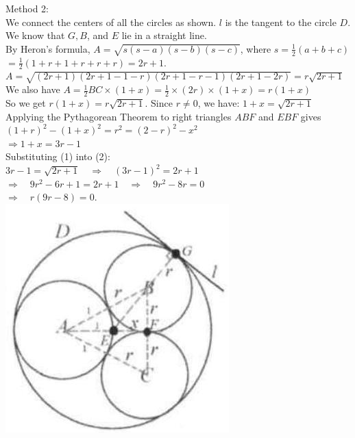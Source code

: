 \documentclass[10pt]{article}
\begin{document}
Method 2:\\
We connect the centers of all the circles as shown. \(l\) is the tangent to the circle \(D\). We know that \(G, B\), and \(E\) lie in a straight line.\\
By Heron's formula, \(A=\sqrt{s(s-a)(s-b)(s-c)}\), where \(s=\frac{1}{2}(a+b+c)\)\\
\(=\frac{1}{2}(1+r+1+r+r+r)=2 r+1\).\\
\(A=\sqrt{(2 r+1)(2 r+1-1-r)(2 r+1-r-1)(2 r+1-2 r)}=r \sqrt{2 r+1}\)\\
We also have \(A=\frac{1}{2} B C \times(1+x)=\frac{1}{2} \times(2 r) \times(1+x)=r(1+x)\)\\
So we get \(r(1+x)=r \sqrt{2 r+1}\). Since \(r \neq 0\), we have: \(1+x=\sqrt{2 r+1}\)\\
Applying the Pythagorean Theorem to right triangles \(A B F\) and \(E B F\) gives\\
\((1+r)^{2}-(1+x)^{2}=r^{2}=(2-r)^{2}-x^{2}\)\\
\(\Rightarrow 1+x=3 r-1\)\\
Substituting (1) into (2):\\
\(3 r-1=\sqrt{2 r+1} \quad \Rightarrow \quad(3 r-1)^{2}=2 r+1\)\\
\(\Rightarrow \quad 9 r^{2}-6 r+1=2 r+1 \quad \Rightarrow \quad 9 r^{2}-8 r=0\)\\
\(\Rightarrow \quad r(9 r-8)=0\).\\
\includegraphics[max width=\textwidth, center]{2025_04_17_97bc1f7e44d93c271a88g-181}
\end{document}
